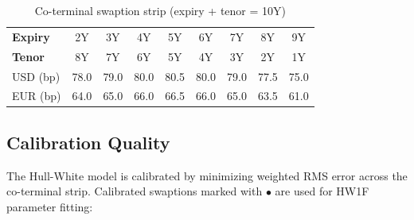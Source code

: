 \documentclass[conference]{IEEEtran}
\begin{document}
\begin{table}[H]
\centering
\begin{tabular}{lcccccccc}
\toprule
\textbf{Expiry} & 2Y & 3Y & 4Y & 5Y & 6Y & 7Y & 8Y & 9Y \\
\textbf{Tenor} & 8Y & 7Y & 6Y & 5Y & 4Y & 3Y & 2Y & 1Y \\
\midrule
USD (bp) & 78.0 & 79.0 & 80.0 & 80.5 & 80.0 & 79.0 & 77.5 & 75.0 \\
EUR (bp) & 64.0 & 65.0 & 66.0 & 66.5 & 66.0 & 65.0 & 63.5 & 61.0 \\
\bottomrule
\end{tabular}
\caption{Co-terminal swaption strip (expiry + tenor = 10Y)}
\end{table}

\subsection{Calibration Quality}

The Hull-White model is calibrated by minimizing weighted RMS error across the co-terminal strip. Calibrated swaptions marked with $\bullet$ are used for HW1F parameter fitting:
\end{document}
